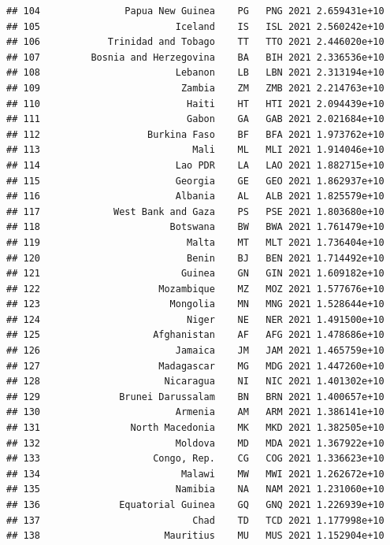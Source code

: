 \documentclass[
]{article}
\begin{document}
\begin{verbatim}
## 104               Papua New Guinea    PG   PNG 2021 2.659431e+10       
## 105                        Iceland    IS   ISL 2021 2.560242e+10       
## 106            Trinidad and Tobago    TT   TTO 2021 2.446020e+10       
## 107         Bosnia and Herzegovina    BA   BIH 2021 2.336536e+10       
## 108                        Lebanon    LB   LBN 2021 2.313194e+10       
## 109                         Zambia    ZM   ZMB 2021 2.214763e+10       
## 110                          Haiti    HT   HTI 2021 2.094439e+10       
## 111                          Gabon    GA   GAB 2021 2.021684e+10       
## 112                   Burkina Faso    BF   BFA 2021 1.973762e+10       
## 113                           Mali    ML   MLI 2021 1.914046e+10       
## 114                        Lao PDR    LA   LAO 2021 1.882715e+10       
## 115                        Georgia    GE   GEO 2021 1.862937e+10       
## 116                        Albania    AL   ALB 2021 1.825579e+10       
## 117             West Bank and Gaza    PS   PSE 2021 1.803680e+10       
## 118                       Botswana    BW   BWA 2021 1.761479e+10       
## 119                          Malta    MT   MLT 2021 1.736404e+10       
## 120                          Benin    BJ   BEN 2021 1.714492e+10       
## 121                         Guinea    GN   GIN 2021 1.609182e+10       
## 122                     Mozambique    MZ   MOZ 2021 1.577676e+10       
## 123                       Mongolia    MN   MNG 2021 1.528644e+10       
## 124                          Niger    NE   NER 2021 1.491500e+10       
## 125                    Afghanistan    AF   AFG 2021 1.478686e+10       
## 126                        Jamaica    JM   JAM 2021 1.465759e+10       
## 127                     Madagascar    MG   MDG 2021 1.447260e+10       
## 128                      Nicaragua    NI   NIC 2021 1.401302e+10       
## 129              Brunei Darussalam    BN   BRN 2021 1.400657e+10       
## 130                        Armenia    AM   ARM 2021 1.386141e+10       
## 131                North Macedonia    MK   MKD 2021 1.382505e+10       
## 132                        Moldova    MD   MDA 2021 1.367922e+10       
## 133                    Congo, Rep.    CG   COG 2021 1.336623e+10       
## 134                         Malawi    MW   MWI 2021 1.262672e+10       
## 135                        Namibia    NA   NAM 2021 1.231060e+10       
## 136              Equatorial Guinea    GQ   GNQ 2021 1.226939e+10       
## 137                           Chad    TD   TCD 2021 1.177998e+10       
## 138                      Mauritius    MU   MUS 2021 1.152904e+10       

\end{verbatim}
\end{document}
